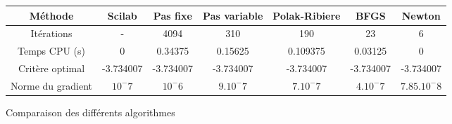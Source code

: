 \documentclass{article}
\begin{document}
    \begin{figure}

        \begin{tabular}{|c|cccccc|}
            \hline
            Méthode & Scilab & Pas fixe & Pas variable & Polak-Ribiere & BFGS & Newton \\
            \hline 
            Itérations & - & 4094 & 310 & 190 & 23 & 6\\
            Temps CPU (s) & 0 & 0.34375 & 0.15625 & 0.109375 & 0.03125 & 0\\
            Critère optimal & -3.734007 & -3.734007 & -3.734007 & -3.734007 & -3.734007 & -3.734007\\
            Norme du gradient & $10^-7$ & $10^-6$ & $9.10^-7$ & $7.10^-7$ & $4.10^-7$ & $7.85.10^-8$\\
            \hline
        \end{tabular}
        \caption{Comparaison des différents algorithmes}
        \label{comparAlgo}
    \end{figure}
\end{document}
